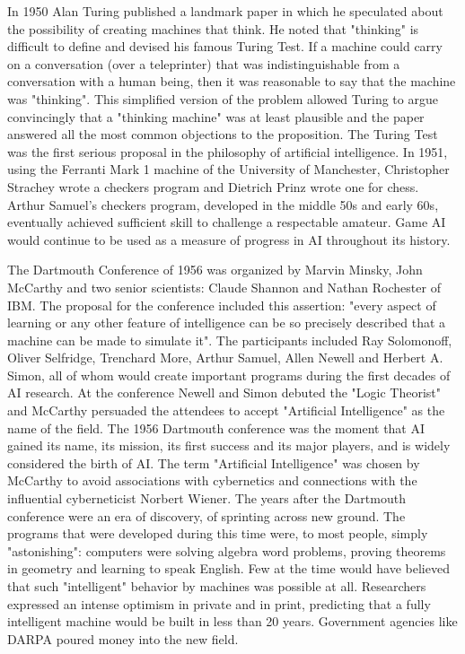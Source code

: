 \documentclass[a4paper,12pt]{report}
\begin{document}
In 1950 Alan Turing published a landmark paper in which he speculated about the possibility of creating machines that think\cite{5}. He noted that "thinking" is difficult to define and devised his famous Turing Test. If a machine could carry on a conversation (over a teleprinter) that was indistinguishable from a conversation with a human being, then it was reasonable to say that the machine was "thinking". This simplified version of the problem allowed Turing to argue convincingly that a "thinking machine" was at least plausible and the paper answered all the most common objections to the proposition. The Turing Test was the first serious proposal in the philosophy of artificial intelligence. In 1951, using the Ferranti Mark 1 machine of the University of Manchester, Christopher Strachey wrote a checkers program and Dietrich Prinz wrote one for chess. Arthur Samuel's checkers program, developed in the middle 50s and early 60s, eventually achieved sufficient skill to challenge a respectable amateur. Game AI would continue to be used as a measure of progress in AI throughout its history.

The Dartmouth Conference of 1956 was organized by Marvin Minsky, John McCarthy and two senior scientists: Claude Shannon and Nathan Rochester of IBM. The proposal for the conference included this assertion: "every aspect of learning or any other feature of intelligence can be so precisely described that a machine can be made to simulate it". The participants included Ray Solomonoff, Oliver Selfridge, Trenchard More, Arthur Samuel, Allen Newell and Herbert A. Simon, all of whom would create important programs during the first decades of AI research. At the conference Newell and Simon debuted the "Logic Theorist" and McCarthy persuaded the attendees to accept "Artificial Intelligence" as the name of the field. The 1956 Dartmouth conference was the moment that AI gained its name, its mission, its first success and its major players, and is widely considered the birth of AI. The term "Artificial Intelligence" was chosen by McCarthy to avoid associations with cybernetics and connections with the influential cyberneticist Norbert Wiener. The years after the Dartmouth conference were an era of discovery, of sprinting across new ground. The programs that were developed during this time were, to most people, simply "astonishing": computers were solving algebra word problems, proving theorems in geometry and learning to speak English. Few at the time would have believed that such "intelligent" behavior by machines was possible at all. Researchers expressed an intense optimism in private and in print, predicting that a fully intelligent machine would be built in less than 20 years. Government agencies like DARPA poured money into the new field.
\end{document}
